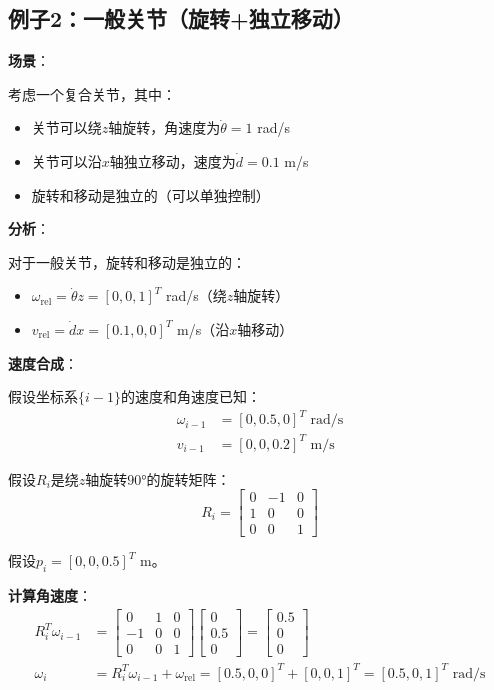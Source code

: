 \documentclass[12pt,a4paper]{article}
\begin{document}
\subsection{例子2：一般关节（旋转+独立移动）}

\textbf{场景}：

考虑一个复合关节，其中：
\begin{itemize}
\item 关节可以绕$z$轴旋转，角速度为$\dot{\theta} = 1$ rad/s
\item 关节可以沿$x$轴独立移动，速度为$\dot{d} = 0.1$ m/s
\item 旋转和移动是独立的（可以单独控制）
\end{itemize}

\textbf{分析}：

对于一般关节，旋转和移动是独立的：
\begin{itemize}
\item $\omega_{\text{rel}} = \dot{\theta} z = [0, 0, 1]^T$ rad/s（绕$z$轴旋转）
\item $v_{\text{rel}} = \dot{d} x = [0.1, 0, 0]^T$ m/s（沿$x$轴移动）
\end{itemize}

\textbf{速度合成}：

假设坐标系$\{i-1\}$的速度和角速度已知：
\begin{align}
\omega_{i-1} &= [0, 0.5, 0]^T \text{ rad/s} \\
v_{i-1} &= [0, 0, 0.2]^T \text{ m/s}
\end{align}

假设$R_i$是绕$z$轴旋转$90°$的旋转矩阵：
\begin{equation}
R_i = \begin{bmatrix}
0 & -1 & 0 \\
1 & 0 & 0 \\
0 & 0 & 1
\end{bmatrix}
\end{equation}

假设$p_i = [0, 0, 0.5]^T$ m。

\textbf{计算角速度}：
\begin{align}
R_i^T \omega_{i-1} &= \begin{bmatrix}
0 & 1 & 0 \\
-1 & 0 & 0 \\
0 & 0 & 1
\end{bmatrix} \begin{bmatrix}
0 \\ 0.5 \\ 0
\end{bmatrix} = \begin{bmatrix}
0.5 \\ 0 \\ 0
\end{bmatrix} \\
\omega_i &= R_i^T \omega_{i-1} + \omega_{\text{rel}} = [0.5, 0, 0]^T + [0, 0, 1]^T = [0.5, 0, 1]^T \text{ rad/s}
\end{align}
\end{document}

